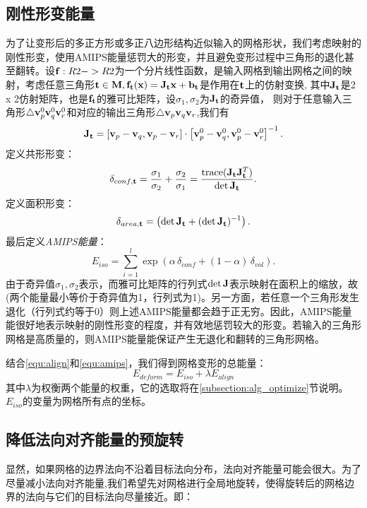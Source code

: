 \subsection{刚性形变能量} \label{sec:egy_amips}
为了让变形后的多正方形或多正八边形结构近似输入的网格形状，我们考虑映射的刚性形变，使用AMIPS能量惩罚大的形变，并且避免变形过程中三角形的退化甚至翻转。设$\mathbf{f}:R2->R2$为一个分片线性函数，是输入网格到输出网格之间的映射，考虑任意三角形$\mathbf{t} \in \mathbf{M}, \mathbf{f}_{\mathbf{t}} (\mathbf{x}) = \mathbf{J}_{\mathbf{t}} \mathbf{x} + \mathbf{b}_{\mathbf{t}}$是作用在$\mathbf{t}$上的仿射变换, 其中$\mathbf{J}_{\mathbf{t}}$是2 x 2仿射矩阵，也是$\mathbf{f}_{\mathbf{t}}$的雅可比矩阵，设$\sigma_{1},\sigma_{2}$为$\mathbf{J}_{\mathbf{t}}$的奇异值，
则对于任意输入三角形$\triangle \mathbf{v}^0_p\mathbf{v}^0_q\mathbf{v}^0_r$和对应的输出三角形$\triangle \mathbf{v}_p\mathbf{v}_q\mathbf{v}_r$,我们有
\begin{equation}
\mathbf{J}_{\mathbf{t}} = \left[\mathbf{v}_p-\mathbf{v}_q , \mathbf{v}_p-\mathbf{v}_r \right] \cdot \left[\mathbf{v}^0_p-\mathbf{v}^0_q , \mathbf{v}^0_p-\mathbf{v}^0_r \right]^{-1}.
\end{equation}
定义共形形变：
\begin{equation}
\delta_{conf,\mathbf{t}} = \frac{\sigma_{1}}{\sigma_{2}} + \frac{\sigma_{2}}{\sigma_{1}} = \frac{\operatorname*{trace}(\mathbf{J}_{\mathbf{t}} \mathbf{J}_{\mathbf{t}} ^T)}{\det \mathbf{J}_{\mathbf{t}}} .
\end{equation}
定义面积形变：
\begin{equation}
\delta_{area,\mathbf{t}} = \left(\det \mathbf{J}_{\mathbf{t}} + (\det \mathbf{J}_{\mathbf{t}})^{-1} \right).
\end{equation}
最后定义\emph{AMIPS能量}：
\begin{equation} \label{equ:amips}
E_{iso} = \sum_{i=1}^l \exp \left(\alpha \, \delta_{conf} + (1-\alpha) \, \delta_{vol} \right).
\end{equation}
由于奇异值$\sigma_{1},\sigma_{2}$表示，而雅可比矩阵的行列式$\det \mathbf{J}$表示映射在面积上的缩放，故(两个能量最小等价于奇异值为1，行列式为1)。另一方面，若任意一个三角形发生退化（行列式约等于0）则上述AMIPS能量都会趋于正无穷。因此，AMIPS能量能很好地表示映射的刚性形变的程度，并有效地惩罚较大的形变。若输入的三角形网格是高质量的，则AMIPS能量能保证产生无退化和翻转的三角形网格。

结合\ref{equ:align}和\ref{equ:amips}，我们得到网格变形的总能量：
\begin{equation}\label{equ:deform}
E_{deform}=E_{iso}+\lambda E_{align}
\end{equation}
其中$\lambda$为权衡两个能量的权重，它的选取将在\ref{subsection:alg_optimize}节说明。$E_{iso}$的变量为网格所有点的坐标。
\subsection{降低法向对齐能量的预旋转} \label{sec:efyalignaxis}
显然，如果网格的边界法向不沿着目标法向分布，法向对齐能量可能会很大。为了尽量减小法向对齐能量,我们希望先对网格进行全局地旋转，使得旋转后的网格边界的法向与它们的目标法向尽量接近。即：

